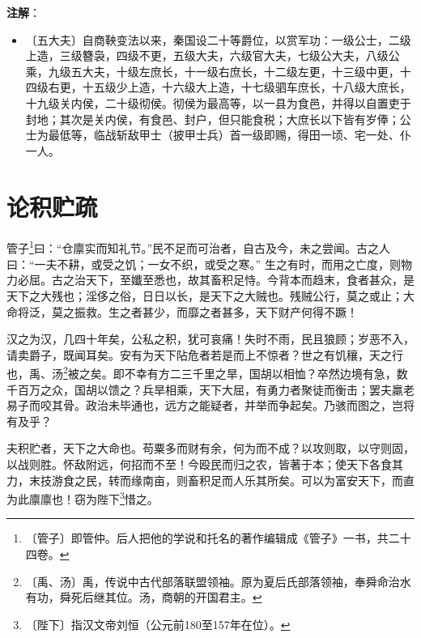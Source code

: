 \documentclass[12pt,UTF-8,openany]{ctexbook}
\begin{document}
\newpage

\textbf{注解}：

\vspace{-1em}

\begin{itemize}
    \setlength\itemsep{-0.2em}
    \item〔五大夫〕自商鞅变法以来，秦国设二十等爵位，以赏军功：一级公士，二级上造，三级簪袅，四级不更，五级大夫，六级官大夫，七级公大夫，八级公乘，九级五大夫，十级左庶长，十一级右庶长，十二级左更，十三级中更，十四级右更，十五级少上造，十六级大上造，十七级驷车庶长，十八级大庶长，十九级关内侯，二十级彻侯。彻侯为最高等，以一县为食邑，并得以自置吏于封地；其次是关内侯，有食邑、封户，但只能食税；大庶长以下皆有岁俸；公士为最低等，临战斩敌甲士（披甲士兵）首一级即赐，得田一顷、宅一处、仆一人。
\end{itemize}

\chapter{论积贮疏}

\begin{normalsize}
    
    管子\footnote{〔管子〕即管仲。后人把他的学说和托名的著作编辑成《管子》一书，共二十四卷。}曰：“仓廪实而知礼节。”民不足而可治者，自古及今，未之尝闻。古之人曰：“一夫不耕，或受之饥；一女不织，或受之寒。” 生之有时，而用之亡度，则物力必屈。古之治天下，至孅至悉也，故其畜积足恃。今背本而趋末，食者甚众，是天下之大残也；淫侈之俗，日日以长，是天下之大贼也。残贼公行，莫之或止；大命将泛，莫之振救。生之者甚少，而靡之者甚多，天下财产何得不蹶！
    
    汉之为汉，几四十年矣，公私之积，犹可哀痛！失时不雨，民且狼顾；岁恶不入，请卖爵子，既闻耳矣。安有为天下阽危者若是而上不惊者？世之有饥穰，天之行也，禹、汤\footnote{〔禹、汤〕禹，传说中古代部落联盟领袖。原为夏后氏部落领袖，奉舜命治水有功，舜死后继其位。汤，商朝的开国君主。}被之矣。即不幸有方二三千里之旱，国胡以相恤？卒然边境有急，数千百万之众，国胡以馈之？兵旱相乘，天下大屈，有勇力者聚徒而衡击；罢夫羸老易子而咬其骨。政治未毕通也，远方之能疑者，并举而争起矣。乃骇而图之，岂将有及乎？
    
    夫积贮者，天下之大命也。苟粟多而财有余，何为而不成？以攻则取，以守则固，以战则胜。怀敌附远，何招而不至！今殴民而归之农，皆著于本；使天下各食其力，末技游食之民，转而缘南亩，则畜积足而人乐其所矣。可以为富安天下，而直为此廪廪也！窃为陛下\footnote{〔陛下〕指汉文帝刘恒（公元前180至157年在位）。}惜之。
\end{normalsize}
\end{document}
